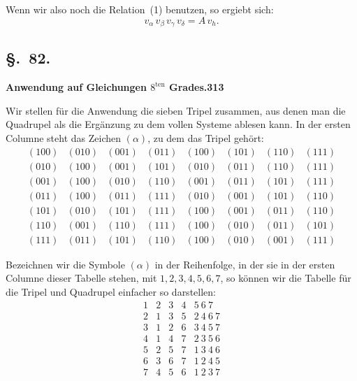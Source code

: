 \documentclass[12pt,a4paper]{article}
\begin{document}
Wenn wir also noch die Relation~(1) benutzen, so ergiebt sich:
\begin{equation}
\tag{9}
v_{\alpha}\,v_{\beta}\,v_{\gamma}\,v_{\delta} = A\,v_h.
\end{equation}

\subsection*{\S.~82.}
\textbf{Anwendung auf Gleichungen $8^{\text{ten}}$ Grades.}\hfill\textbf{313}\\[4pt]

Wir stellen f\"ur die Anwendung die sieben Tripel zusammen, aus denen man die Quadrupel als die Erg\"anzung zu dem vollen Systeme ablesen kann. In der ersten Columne steht das Zeichen $(\alpha)$, zu dem das Tripel geh\"ort:
\[
\begin{array}{c|ccc|cccc}
(100) & (010) & (001) & (011) & (100) & (101) & (110) & (111)\\
(010) & (100) & (001) & (101) & (010) & (011) & (110) & (111)\\
(001) & (100) & (010) & (110) & (001) & (011) & (101) & (111)\\
(011) & (100) & (011) & (111) & (010) & (001) & (101) & (110)\\
(101) & (010) & (101) & (111) & (100) & (001) & (011) & (110)\\
(110) & (001) & (110) & (111) & (100) & (010) & (011) & (101)\\
(111) & (011) & (101) & (110) & (100) & (010) & (001) & (111)
\end{array}
\]

Bezeichnen wir die Symbole $(\alpha)$ in der Reihenfolge, in der sie in der ersten Columne dieser Tabelle stehen, mit $1,2,3,4,5,6,7$, so k\"onnen wir die Tabelle f\"ur die Tripel und Quadrupel einfacher so darstellen:
\[
\begin{array}{c|cccc}
1 & 2 & 3 & 4 & 5\ 6\ 7\\
2 & 1 & 3 & 5 & 2\ 4\ 6\ 7\\
3 & 1 & 2 & 6 & 3\ 4\ 5\ 7\\
4 & 1 & 4 & 7 & 2\ 3\ 5\ 6\\
5 & 2 & 5 & 7 & 1\ 3\ 4\ 6\\
6 & 3 & 6 & 7 & 1\ 2\ 4\ 5\\
7 & 4 & 5 & 6 & 1\ 2\ 3\ 7
\end{array}
\]
\end{document}
